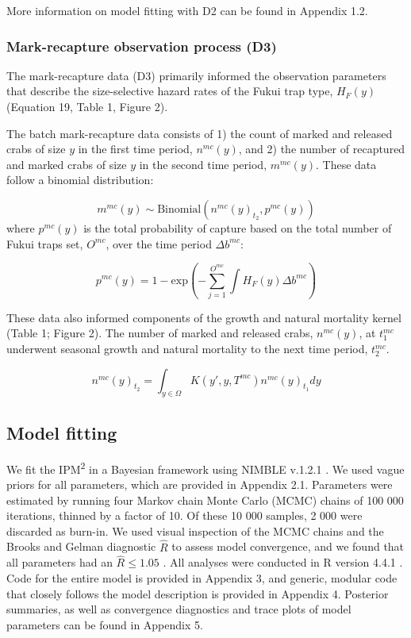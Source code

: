 \documentclass{article}
\begin{document}
More information on model fitting with D2 can be found in Appendix 1.2.

\subsubsection*{Mark-recapture observation process (D3)}

The mark-recapture data (D3) primarily informed the observation parameters that describe the size-selective hazard rates of the Fukui trap type, $H_F(y)$ (Equation 19, Table 1, Figure 2).

The batch mark-recapture data consists of 1) the count of marked and released crabs of size $y$ in the first time period, $n^{mc}(y)$, and 2) the number of recaptured and marked crabs of size $y$ in the second time period, $m^{mc}(y)$. These data follow a binomial distribution:

\begin{equation}
m^{mc}(y) \sim \text{Binomial}(n^{mc}(y)_{t_2}, p^{mc}(y)) 
\end{equation}
where $p^{mc}(y)$ is the total probability of capture based on the total number of Fukui traps set, $O^{mc}$, over the time period $\Delta b^{mc}$:

\begin{equation}
p^{mc}(y) = 1-\text{exp}\left(-\sum_{j=1}^{O^{mc}}\int H_F(y)\Delta b^{mc}\right)
\end{equation}

These data also informed components of the growth and natural mortality kernel (Table 1; Figure 2). The number of marked and released crabs, $n^{mc}(y)$, at $t_1^{mc}$ underwent seasonal growth and natural mortality to the next time period, $t_2^{mc}$.

\begin{equation}
n^{mc}(y)_{t{_2}} = \int_{y \in \Omega} K(y',y, T^{mc}) n^{mc}(y)_{t_1}dy
\end{equation}

\subsection{Model fitting}
We fit the IPM\textsuperscript{2} in a Bayesian framework using NIMBLE v.1.2.1 \parencite{de2017programming}. We used vague priors for all parameters, which are provided in Appendix 2.1. Parameters were estimated by running four Markov chain Monte Carlo (MCMC) chains of 100 000 iterations, thinned by a factor of 10. Of these 10 000 samples, 2 000 were discarded as burn-in. We used visual inspection of the MCMC chains and the Brooks and Gelman diagnostic $\hat{R}$ to assess model convergence, and we found that all parameters had an $\hat{R} \leq 1.05$ \parencite{brooks1998general}. All analyses were conducted in R version 4.4.1 \parencite{Rcore}. Code for the entire model is provided in Appendix 3, and generic, modular code that closely follows the model description is provided in Appendix 4. Posterior summaries, as well as convergence diagnostics and trace plots of model parameters can be found in Appendix 5.
\end{document}
